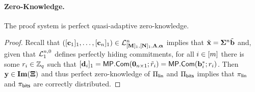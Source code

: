 \paragraph{Zero-Knowledge.}

\begin{theorem}
The proof system is perfect quasi-adaptive zero-knowledge.
\end{theorem}

\begin{proof}
Recall that $([\mathbf{c}_1]_1,\ldots,[\mathbf{c}_n]_1)\in\mathcal{L}^n_{[\mathbf{{M}}]_1,[\mathbf{{N}}]_1,\mathbf{{\Lambda}},{\boldsymbol \alpha}}$ implies that
$
{\tilde{\mathbf{x}}}
=\mathbf{{\Sigma}}^n{\tilde{\mathbf{b}}}
$
and, given that $\mathcal{L}_1^{n,0}$ defines perfectly hiding commitments, for all $i\in[{m}]$ there is some $r_i\in\mathbb{Z}_q$ such that
$[\mathbf{d}_i]_1=\mathsf{MP}.\mathsf{Com}(\mathbf{{0}}_{n\times1};\tilde{{r}}_i)=\mathsf{MP}.\mathsf{Com}(\mathbf{b}_i^*;r_i)$. Then $\mathbf{y}\in\mathbf{Im}(\mathbf{{\Xi}})$ and thus perfect zero-knowledge of $\Pi_{\mathsf{lin}}$ and $\Pi_{\mathsf{bits}}$ implies that $\pi_{\mathsf{lin}}$ and $\pi_{\mathsf{bits}}$ are correctly distributed.
\end{proof}
